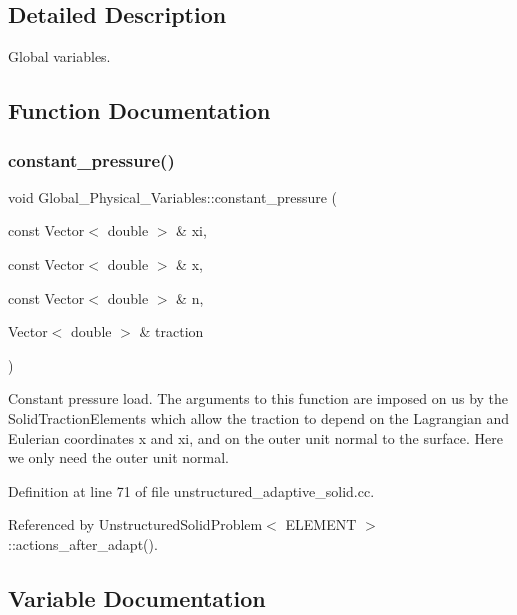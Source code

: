 \subsection{Detailed Description}
Global variables. 

\subsection{Function Documentation}
\mbox{\label{namespaceGlobal__Physical__Variables_a19f4e20a92e7d216b4d2b00308f96917}} 
\subsubsection{\texorpdfstring{constant\+\_\+pressure()}{constant\_pressure()}}
{\footnotesize\ttfamily void Global\+\_\+\+Physical\+\_\+\+Variables\+::constant\+\_\+pressure (\begin{DoxyParamCaption}\item[{const Vector$<$ double $>$ \&}]{xi,  }\item[{const Vector$<$ double $>$ \&}]{x,  }\item[{const Vector$<$ double $>$ \&}]{n,  }\item[{Vector$<$ double $>$ \&}]{traction }\end{DoxyParamCaption})}



Constant pressure load. The arguments to this function are imposed on us by the Solid\+Traction\+Elements which allow the traction to depend on the Lagrangian and Eulerian coordinates x and xi, and on the outer unit normal to the surface. Here we only need the outer unit normal. 



Definition at line 71 of file unstructured\+\_\+adaptive\+\_\+solid.\+cc.



Referenced by Unstructured\+Solid\+Problem$<$ E\+L\+E\+M\+E\+N\+T $>$\+::actions\+\_\+after\+\_\+adapt().



\subsection{Variable Documentation}
\mbox{\label{namespaceGlobal__Physical__Variables_a2a37fb040c832ee7a086bb13bb02a100}} 
